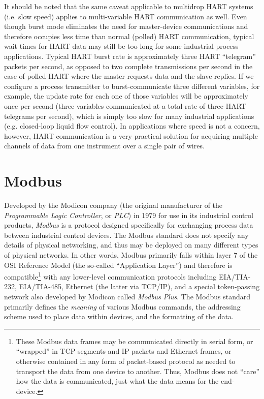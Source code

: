 It should be noted that the same caveat applicable to multidrop HART systems (i.e. slow speed) applies to multi-variable HART communication as well.  Even though burst mode eliminates the need for master-device communications and therefore occupies less time than normal (polled) HART communication, typical wait times for HART data may still be too long for some industrial process applications.  Typical HART burst rate is approximately three HART ``telegram'' packets per second, as opposed to two complete transmissions per second in the case of polled HART where the master requests data and the slave replies.  If we configure a process transmitter to burst-communicate three different variables, for example, the update rate for each one of those variables will be approximately once per second (three variables communicated at a total rate of three HART telegrams per second), which is simply too slow for many industrial applications (e.g. closed-loop liquid flow control).  In applications where speed is not a concern, however, HART communication is a very practical solution for acquiring multiple channels of data from one instrument over a single pair of wires.








\filbreak
\section{Modbus}

Developed by the Modicon company (the original manufacturer of the \textit{Programmable Logic Controller}, or \textit{PLC}) in 1979 for use in its industrial control products, \textit{Modbus} is a protocol designed specifically for exchanging process data between industrial control devices.  The Modbus standard does not specify any details of physical networking, and thus may be deployed on many different types of physical networks.  In other words, Modbus primarily falls within layer 7 of the OSI Reference Model (the so-called ``Application Layer'') and therefore is compatible\footnote{These Modbus data frames may be communicated directly in serial form, or ``wrapped'' in TCP segments and IP packets and Ethernet frames, or otherwise contained in any form of packet-based protocol as needed to transport the data from one device to another.  Thus, Modbus does not ``care'' how the data is communicated, just what the data means for the end-device.} with any lower-level communication protocols including EIA/TIA-232, EIA/TIA-485, Ethernet (the latter via TCP/IP), and a special token-passing network also developed by Modicon called \textit{Modbus Plus}.  The Modbus standard primarily defines the \textit{meaning} of various Modbus commands, the addressing scheme used to place data within devices, and the formatting of the data.                

